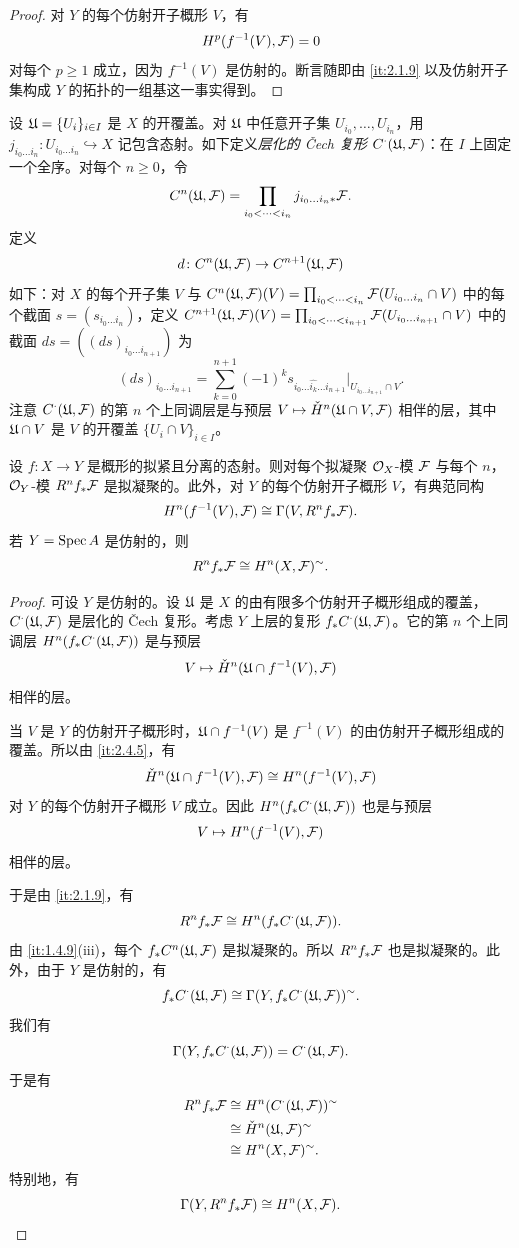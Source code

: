 \begin{proof}
对 $Y$ 的每个仿射开子概形 $V$，有
\[
H^p(f^{-1}(V),\mathcal{F})=0
\]
对每个 $p\ge 1$ 成立，因为 $f^{-1}(V)$ 是仿射的。断言随即由 \ref{it:2.1.9} 以及仿射开子集构成 $Y$ 的拓扑的一组基这一事实得到。
\end{proof}

设 $\mathfrak{U}=\{U_i\}_{i\in I}$ 是 $X$ 的开覆盖。对 $\mathfrak{U}$ 中任意开子集 $U_{i_0},\dots,U_{i_n}$，用 $j_{i_0\dots i_n}\colon U_{i_0\dots i_n}\hookrightarrow X$ 记包含态射。如下定义\emph{层化的 \v{C}ech 复形} $C^{\cdot}(\mathfrak{U},\mathcal{F})$：在 $I$ 上固定一个全序。对每个 $n\ge 0$，令
\[
C^n(\mathfrak{U},\mathcal{F})=\prod_{i_0<\cdots<i_n}j_{i_0\dots i_n*}\mathcal{F}.
\]
定义
\[
d\colon C^n(\mathfrak{U},\mathcal{F})\to C^{n+1}(\mathfrak{U},\mathcal{F})
\]
如下：对 $X$ 的每个开子集 $V$ 与 $C^n(\mathfrak{U},\mathcal{F})(V)=\prod_{i_0<\cdots<i_n}\mathcal{F}(U_{i_0\dots i_n}\cap V)$ 中的每个截面 $s=(s_{i_0\dots i_n})$，定义 $C^{n+1}(\mathfrak{U},\mathcal{F})(V)=\prod_{i_0<\cdots<i_{n+1}}\mathcal{F}(U_{i_0\dots i_{n+1}}\cap V)$ 中的截面 $ds=((ds)_{i_0\dots i_{n+1}})$ 为
\[
(ds)_{i_0\dots i_{n+1}}=\sum_{k=0}^{n+1}(-1)^ks_{i_0\dots\hat{i_k}\dots i_{n+1}}\big|_{U_{i_0\dots i_{n+1}}\cap V}.
\]
注意 $C^{\cdot}(\mathfrak{U},\mathcal{F})$ 的第 $n$ 个上同调层是与预层 $V\mapsto\check{H}^n(\mathfrak{U}\cap V,\mathcal{F})$ 相伴的层，其中 $\mathfrak{U}\cap V$ 是 $V$ 的开覆盖 $\{U_i\cap V\}_{i\in I}$。

\begin{proposition}\label{it:2.4.9}
设 $f\colon X\to Y$ 是概形的拟紧且分离的态射。则对每个拟凝聚 $\mathcal{O}_X$-模 $\mathcal{F}$ 与每个 $n$，$\mathcal{O}_Y$-模 $R^nf_*\mathcal{F}$ 是拟凝聚的。此外，对 $Y$ 的每个仿射开子概形 $V$，有典范同构
\[
H^n(f^{-1}(V),\mathcal{F})\cong\Gamma(V,R^nf_*\mathcal{F}).
\]
若 $Y=\operatorname{Spec} A$ 是仿射的，则
\[
R^nf_*\mathcal{F}\cong H^n(X,\mathcal{F})^{\sim}.
\]
\end{proposition}

\begin{proof}
可设 $Y$ 是仿射的。设 $\mathfrak{U}$ 是 $X$ 的由有限多个仿射开子概形组成的覆盖，$C^{\cdot}(\mathfrak{U},\mathcal{F})$ 是层化的 \v{C}ech 复形。考虑 $Y$ 上层的复形 $f_*C^{\cdot}(\mathfrak{U},\mathcal{F})$。它的第 $n$ 个上同调层 $H^n(f_*C^{\cdot}(\mathfrak{U},\mathcal{F}))$ 是与预层
\[
V\mapsto\check{H}^n(\mathfrak{U}\cap f^{-1}(V),\mathcal{F})
\]
相伴的层。

当 $V$ 是 $Y$ 的仿射开子概形时，$\mathfrak{U}\cap f^{-1}(V)$ 是 $f^{-1}(V)$ 的由仿射开子概形组成的覆盖。所以由 \ref{it:2.4.5}，有
\[
\check{H}^n(\mathfrak{U}\cap f^{-1}(V),\mathcal{F})\cong H^n(f^{-1}(V),\mathcal{F})
\]
对 $Y$ 的每个仿射开子概形 $V$ 成立。因此 $H^n(f_*C^{\cdot}(\mathfrak{U},\mathcal{F}))$ 也是与预层
\[
V\mapsto H^n(f^{-1}(V),\mathcal{F})
\]
相伴的层。

于是由 \ref{it:2.1.9}，有
\[
R^nf_*\mathcal{F}\cong H^n(f_*C^{\cdot}(\mathfrak{U},\mathcal{F})).
\]
由 \ref{it:1.4.9}(iii)，每个 $f_*C^n(\mathfrak{U},\mathcal{F})$ 是拟凝聚的。所以 $R^nf_*\mathcal{F}$ 也是拟凝聚的。此外，由于 $Y$ 是仿射的，有
\[
f_*C^{\cdot}(\mathfrak{U},\mathcal{F})\cong\Gamma(Y,f_*C^{\cdot}(\mathfrak{U},\mathcal{F}))^{\sim}.
\]
我们有
\[
\Gamma(Y,f_*C^{\cdot}(\mathfrak{U},\mathcal{F}))=C^{\cdot}(\mathfrak{U},\mathcal{F}).
\]
于是有
\[
\begin{aligned}
R^nf_*\mathcal{F}&\cong H^n(C^{\cdot}(\mathfrak{U},\mathcal{F}))^{\sim}\\
&\cong\check{H}^n(\mathfrak{U},\mathcal{F})^{\sim}\\
&\cong H^n(X,\mathcal{F})^{\sim}.
\end{aligned}
\]
特别地，有
\[
\Gamma(Y,R^nf_*\mathcal{F})\cong H^n(X,\mathcal{F}).
\]
\end{proof}

